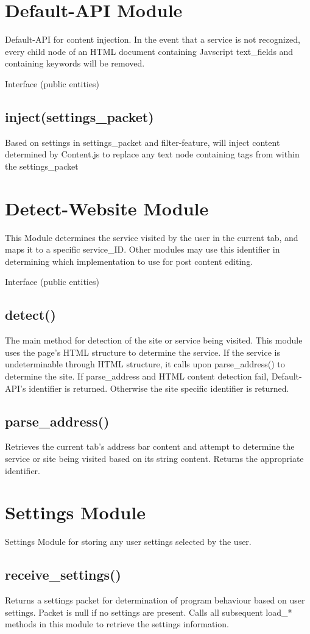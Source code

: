\documentclass[12pt, titlepage]{article}
\begin{document}
\section{Default-API Module}
Default-API for content injection. In the event that a service is not recognized, every child node of an HTML document containing Javscript text\_fields and containing keywords will be removed.

Interface (public entities)
\subsection{inject(settings\_packet)}
Based on settings in settings\_packet and filter-feature, will inject content determined by Content.js to replace any text node containing tags from within the settings\_packet

\section{Detect-Website Module}
This Module determines the service visited by the user in the current tab, and maps it to a specific service\_ID. Other modules may use this identifier in determining which implementation to use for post content editing.

Interface (public entities)
\subsection{detect()}
The main method for detection of the site or service being visited. This module uses the page's HTML structure to determine the service. If the service is undeterminable through HTML structure, it calls upon parse\_address() to determine the site. If parse\_address and HTML content detection fail, Default-API's identifier is returned. Otherwise the site specific identifier is returned.
\subsection{parse\_address()}
Retrieves the current tab's address bar content and attempt to determine the service or site being visited based on its string content. Returns the appropriate identifier.

\section{Settings Module}
Settings Module for storing any user settings selected by the user.
\subsection{receive\_settings()}
Returns a settings packet for determination of program behaviour based on user settings. Packet is null if no settings are present. Calls all subsequent load\_* methods in this module to retrieve the settings information.
\end{document}
